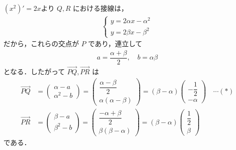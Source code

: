 \documentclass[../../main.tex]{subfiles}
\begin{document}
$(x^2)'=2x$より $Q, R$ における接線は，
\begin{align}
  \begin{cases}
    y = 2\alpha x - \alpha^2 \\
    y = 2\beta x - \beta^2
  \end{cases} \label{eq:1}
\end{align}
だから，これらの交点が $P$ であり，連立して
\begin{align}
  a = \dfrac{\alpha+\beta}{2}, \quad b = \alpha\beta \label{eq:2}
\end{align}
となる．したがって $\overrightarrow{PQ},\overrightarrow{PR}$ は
\begin{align}
  \overrightarrow{PQ} &=
  \begin{pmatrix} \alpha-a \\ \alpha^2-b
  \end{pmatrix} =
  \begin{pmatrix} \dfrac{\alpha-\beta}{2} \\ \alpha(\alpha-\beta)
  \end{pmatrix} = (\beta-\alpha)
  \begin{pmatrix} -\dfrac{1}{2} \\ -\alpha
  \end{pmatrix} \quad \cdots (*) \\
  \overrightarrow{PR} &=
  \begin{pmatrix} \beta-a \\ \beta^2-b
  \end{pmatrix} =
  \begin{pmatrix} \dfrac{-\alpha+\beta}{2} \\ \beta(\beta-\alpha)
  \end{pmatrix} = (\beta-\alpha)
  \begin{pmatrix} \dfrac{1}{2} \\ \beta
  \end{pmatrix} \label{eq:3}
\end{align}
である．
\end{document}
